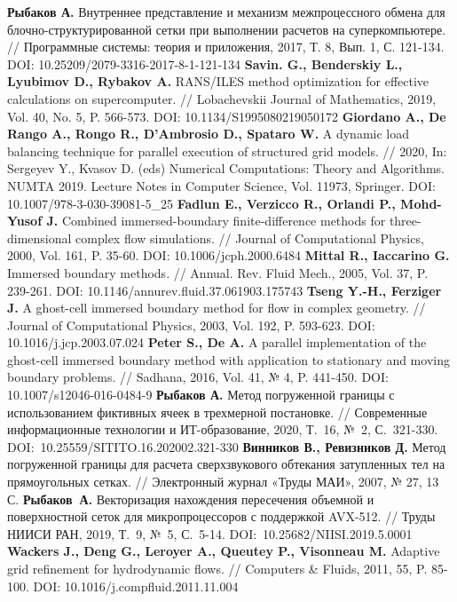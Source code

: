 \begin{thebibliography}{99}
%
\textbf{Рыбаков А.} Внутреннее представление и механизм межпроцессного обмена для блочно-структурированной сетки при выполнении расчетов на суперкомпьютере. // Программные системы: теория и приложения, 2017, Т. 8, Вып. 1, С. 121-134. DOI: 10.25209/2079-3316-2017-8-1-121-134
%
\textbf{Savin. G., Benderskiy L., Lyubimov D., Rybakov A.} RANS/ILES method optimization for effective calculations on supercomputer. // Lobachevskii Journal of Mathematics, 2019, Vol. 40, No. 5, P. 566-573. DOI: 10.1134/S1995080219050172
%
\textbf{Giordano A., De Rango A., Rongo R., D'Ambrosio D., Spataro W.} A dynamic load balancing technique for parallel execution of structured grid models. // 2020, In: Sergeyev Y., Kvasov D. (eds) Numerical Computations: Theory and Algorithms. NUMTA 2019. Lecture Notes in Computer Science, Vol. 11973, Springer. DOI: 10.1007/978-3-030-39081-5\_25
%
\textbf{Fadlun E., Verzicco R., Orlandi P., Mohd-Yusof J.} Combined immersed-boundary finite-difference methods for three-dimensional complex flow simulations. // Journal of Computational Physics, 2000, Vol. 161, P. 35-60. DOI: 10.1006/jcph.2000.6484
%
\textbf{Mittal R., Iaccarino G.} Immersed boundary methods. // Annual. Rev. Fluid Mech., 2005, Vol. 37, P. 239-261. DOI: 10.1146/annurev.fluid.37.061903.175743
%
\textbf{Tseng Y.-H., Ferziger J.} A ghost-cell immersed boundary method for flow in complex geometry. // Journal of Computational Physics, 2003, Vol. 192, P. 593-623. DOI: 10.1016/j.jcp.2003.07.024
%
\textbf{Peter S., De A.} A parallel implementation of the ghost-cell immersed boundary method with application to stationary and moving boundary problems. // Sadhana, 2016, Vol. 41, № 4, P. 441-450. DOI: 10.1007/s12046-016-0484-9
%
\textbf{Рыбаков А.} Метод погруженной границы с использованием фиктивных ячеек в трехмерной постановке. // Современные информационные технологии и ИТ-образование, 2020, Т.~16, №~2, С.~321-330. DOI:~10.25559/SITITO.16.202002.321-330
%
\textbf{Винников В., Ревизников Д.} Метод погруженной границы для расчета сверхзвукового обтекания затупленных тел на прямоугольных сетках. // Электронный журнал «Труды МАИ», 2007, № 27, 13 С.
%
\textbf{Рыбаков~А.} Векторизация нахождения пересечения объемной и поверхностной сеток для микропроцессоров с поддержкой AVX-512. // Труды НИИСИ РАН, 2019, Т.~9, №~5, С.~5-14. DOI:~10.25682/NIISI.2019.5.0001
%
\textbf{Wackers J., Deng G., Leroyer A., Queutey P., Visonneau M.} Adaptive grid refinement for hydrodynamic flows. // Computers \& Fluids, 2011, 55, P. 85-100. DOI: 10.1016/j.compfluid.2011.11.004

\end{thebibliography}
